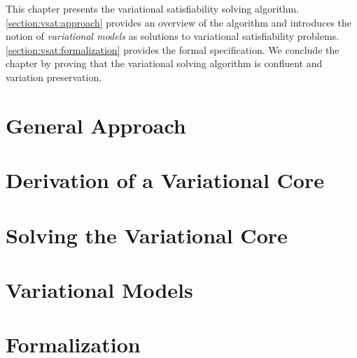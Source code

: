 \label{chapter:vsat}

This chapter presents the variational satisfiability solving algorithm.
\autoref{section:vsat:approach} provides an overview of the algorithm and
introduces the notion of \emph{variational models} as solutions to variational
satisfiability problems. \autoref{section:vsat:formalization} provides the
formal specification. We conclude the chapter by proving that the variational solving
algorithm is confluent and variation preservation.

\section{General Approach}


\section{Derivation of a Variational Core}


\section{Solving the Variational Core}


\section{Variational Models}


\section{Formalization}


